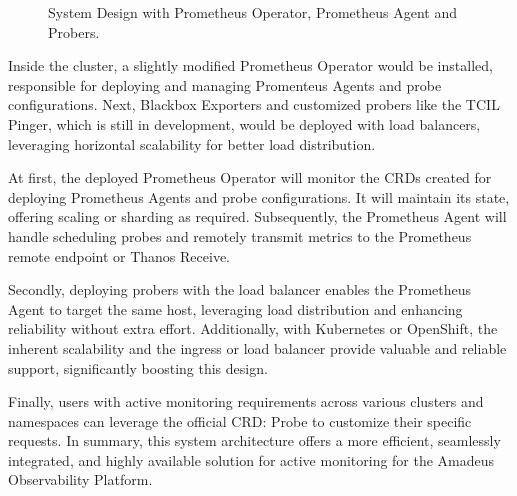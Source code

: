 \begin{figure}[htpb]
  \caption[System Design - Prometheus Operator, Prometheus Agent and Probers]{System Design with Prometheus Operator, Prometheus Agent and Probers.}\label{fig:system-design}
\end{figure}

Inside the cluster, a slightly modified Prometheus Operator would be installed, responsible for deploying and managing Promenteus Agents and probe configurations. Next, Blackbox Exporters and customized probers like the \ac{TCIL} Pinger, which is still in development, would be deployed with load balancers, leveraging horizontal scalability for better load distribution. 

At first, the deployed Prometheus Operator will monitor the \ac{CRD}s created for deploying Prometheus Agents and probe configurations. It will maintain its state, offering scaling or sharding as required. Subsequently, the Prometheus Agent will handle scheduling probes and remotely transmit metrics to the Prometheus remote endpoint or Thanos Receive. 

Secondly, deploying probers with the load balancer enables the Prometheus Agent to target the same host, leveraging load distribution and enhancing reliability without extra effort. Additionally, with Kubernetes or OpenShift, the inherent scalability and the ingress or load balancer provide valuable and reliable support, significantly boosting this design. 

Finally, users with active monitoring requirements across various clusters and namespaces can leverage the official \ac{CRD}: Probe to customize their specific requests. In summary, this system architecture offers a more efficient, seamlessly integrated, and highly available solution for active monitoring for the Amadeus Observability Platform. 

